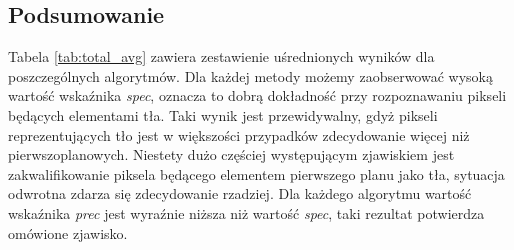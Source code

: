 \subsection{Podsumowanie}
\label{subsec:testy_podsumowanie}

Tabela \ref{tab:total_avg} zawiera zestawienie uśrednionych wyników dla poszczególnych algorytmów. 
Dla każdej metody możemy zaobserwować wysoką wartość wskaźnika \textit{spec}, oznacza to dobrą dokładność przy rozpoznawaniu pikseli będących elementami tła. 
Taki wynik jest przewidywalny, gdyż pikseli reprezentujących tło jest w większości przypadków zdecydowanie więcej niż pierwszoplanowych. 
Niestety dużo częściej występującym zjawiskiem jest zakwalifikowanie piksela będącego elementem pierwszego planu jako tła, sytuacja odwrotna zdarza się zdecydowanie rzadziej. 
Dla każdego algorytmu wartość wskaźnika \textit{prec} jest wyraźnie niższa niż wartość \textit{spec}, taki rezultat potwierdza omówione zjawisko. 

